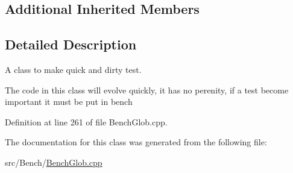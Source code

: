 \subsection*{Additional Inherited Members}


\subsection{Detailed Description}
A class to make quick and dirty test. 

The code in this class will evolve quickly, it has no perenity, if a test become important it must be put in bench 

Definition at line 261 of file Bench\+Glob.\+cpp.



The documentation for this class was generated from the following file\+:\begin{DoxyCompactItemize}
\item 
src/\+Bench/\hyperlink{BenchGlob_8cpp}{Bench\+Glob.\+cpp}\end{DoxyCompactItemize}
